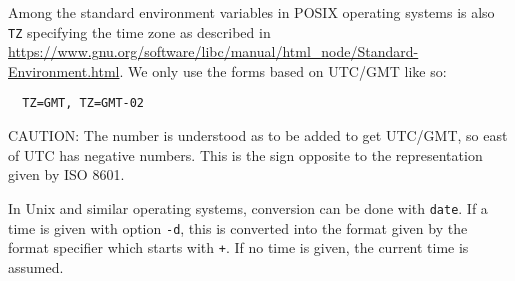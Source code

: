 \documentclass[a4paper, english]{article}%
\begin{document}
Among the standard environment variables in POSIX operating systems 
is also \texttt{TZ} specifying the time zone 
as described in \url{https://www.gnu.org/software/libc/manual/html_node/Standard-Environment.html}. 
We only use the forms based on UTC/GMT like so: 
%
\begin{verbatim}
  TZ=GMT, TZ=GMT-02
\end{verbatim}
%
CAUTION: The number is understood as to be added to get UTC/GMT, 
so east of UTC has negative numbers. 
This is the sign opposite to the representation given by ISO 8601. 

In Unix and similar operating systems, conversion can be done with \texttt{date}. 
If a time is given with option \texttt{-d}, 
this is converted into the format given by the format specifier which starts with \texttt{+}. 
If no time is given, the current time is assumed. 
%
\end{document}

